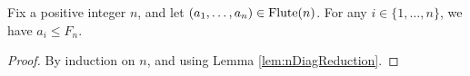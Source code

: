 \begin{proposition}
    \label{prop:FluteBounded}
    Fix a positive integer $n$, and let $(a_1, \ldots, a_n) \in {\rm Flute}(n)$. 
    For any $i \in \{1,\ldots, n\}$, we have $a_i \leq F_n$. 
\end{proposition}
\begin{proof}
   By induction on $n$, and using Lemma \ref{lem:nDiagReduction}.
\end{proof}
